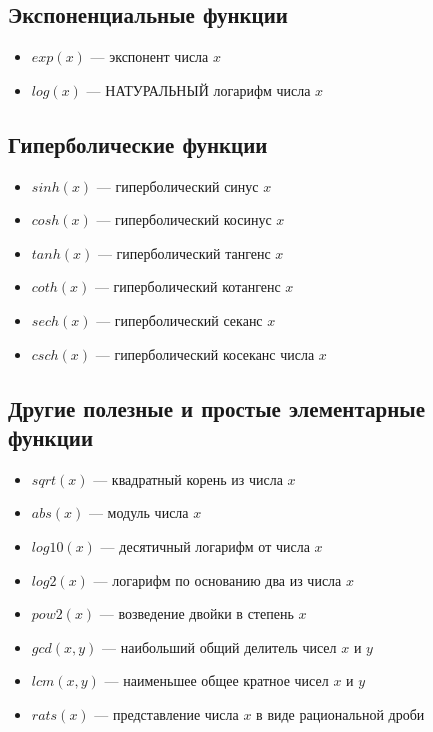 \documentclass[12pt, a4paper,oneside]{book}
\begin{document}
\subsection{Экспоненциальные функции}
\begin{itemize}
  \item{$exp(x)$ --- экспонент числа $x$}
  \item{$log(x)$ --- НАТУРАЛЬНЫЙ логарифм числа $x$}
\end{itemize}

\subsection{Гиперболические функции}
\begin{itemize}
  \item{$sinh(x)$ --- гиперболический синус $x$}
  \item{$cosh(x)$ --- гиперболический косинус $x$}
  \item{$tanh(x)$ --- гиперболический тангенс $x$}
  \item{$coth(x)$ --- гиперболический котангенс $x$}
  \item{$sech(x)$ --- гиперболический секанс $x$}
  \item{$csch(x)$ --- гиперболический косеканс числа $x$}
\end{itemize}

\subsection{Другие полезные и простые элементарные функции}
\begin{itemize}
  \item{$sqrt(x)$ --- квадратный корень из числа $x$}
  \item{$abs(x)$ --- модуль числа $x$}
  \item{$log10(x)$ --- десятичный логарифм от числа $x$}
  \item{$log2(x)$ --- логарифм по основанию два из числа $x$}
  \item{$pow2(x)$ --- возведение двойки в степень $x$}
  \item{$gcd(x, y)$ --- наибольший общий делитель чисел $x$ и $y$}
  \item {$lcm(x, y)$ --- наименьшее общее кратное чисел $x$ и $y$}
  \item{$rats(x)$ --- представление числа $x$ в виде рациональной дроби}
\end{itemize}
\end{document}
